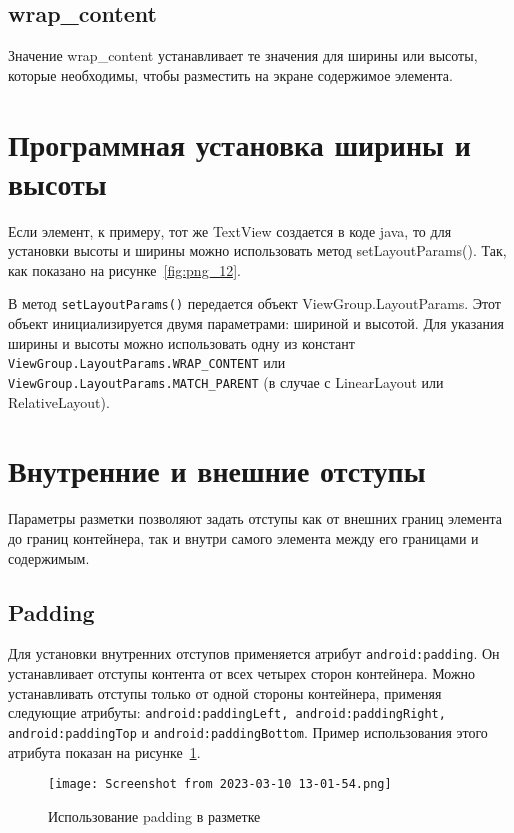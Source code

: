 \subsection{wrap\_content}
Значение wrap\_content устанавливает те значения для ширины или высоты,
которые необходимы, чтобы разместить на экране содержимое элемента.

\section{Программная установка ширины и высоты}
Если элемент, к примеру, тот же TextView создается в коде java, то для
установки высоты и ширины можно использовать метод setLayoutParams().
Так, как показано на рисунке~\ref{fig:png_12}.

В метод \texttt{setLayoutParams()} передается объект ViewGroup.LayoutParams.
Этот объект инициализируется двумя параметрами: шириной и высотой.
Для указания ширины и высоты можно использовать одну из констант
\texttt{ViewGroup.LayoutParams.WRAP\_CONTENT} или
\texttt{ViewGroup.LayoutParams.MATCH\_PARENT} (в случае с LinearLayout или
RelativeLayout).

\section{Внутренние и внешние отступы}
Параметры разметки позволяют задать отступы как от внешних границ
элемента до границ контейнера, так и внутри самого элемента между его
границами и содержимым.

\subsection{Padding}
Для установки внутренних отступов применяется атрибут
\texttt{android:padding}. Он устанавливает отступы контента от всех четырех
сторон контейнера. Можно устанавливать отступы только от одной стороны
контейнера, применяя следующие атрибуты:
\texttt{android:paddingLeft, android:paddingRight,
android:paddingTop} и \texttt{android:paddingBottom}.
Пример использования этого атрибута показан на рисунке~\ref{fig:xml:padding}.

\begin{figure}[h!tp]
	\centering
	\texttt{[image: Screenshot from 2023-03-10 13-01-54.png]}
	\caption{Использование padding в разметке}
	\label{fig:xml:padding}
\end{figure}


